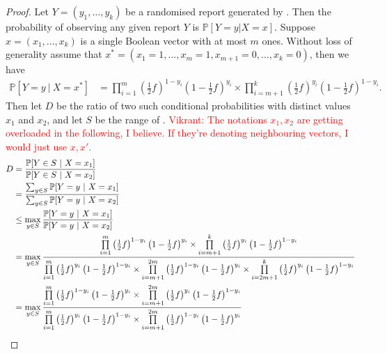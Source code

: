 \documentclass{article}
\begin{document}
\begin{proof}
	Let $Y=(y_1,\ldots,y_k)$ be a randomised report generated by . Then the probability of observing any given report $Y$ is $\mathbb{P}[Y=y | X=x]$. Suppose $x=(x_1,\ldots,x_k)$ is a single Boolean vector with at most $m$ ones. 
	Without loss of generality assume that $x^*=(x_1=1,\ldots,x_m=1,x_{m+1}=0,\ldots,x_k=0)$, then we have
	\begin{align*}
		\mathbb{P}[Y=y~|~X=x^*] &=%
			\prod\limits_{i=1}^m \left(\frac{1}{2}f\right)^{1-y_i}\left(1-\frac{1}{2}f\right)^{y_i}%
			\times \prod\limits_{i=m+1}^k\left(\frac{1}{2}f\right)^{y_i} \left(1-\frac{1}{2}f\right)^{1-y_i}.
	\end{align*}
	Then let $D$ be the ratio of two such conditional probabilities with distinct values $x_1$ and $x_2$, and let $S$ be the range of . \textcolor{red}{Vikrant: The notations $x_1,x_2$ are getting overloaded in the following, I believe. If they're denoting neighbouring vectors, I would just use $x,x'$.}
	\begin{align}
		D &= \frac{\mathbb{P}[Y\in S~|~X=x_1]}{\mathbb{P}[Y\in S~|~X=x_2]}\\
			&= \frac{\sum_{y\in S}\mathbb{P}[Y=y~|~X=x_1]}{\sum_{y\in S}\mathbb{P}[Y=y~|~X=x_2]}\nonumber\\
			&\leq \max_{y\in S}\frac{\mathbb{P}[Y=y~|~X=x_1]}{\mathbb{P}[Y=y~|~X=x_2]}\nonumber\\
			&=\max_{y\in S}\frac{%
				\prod\limits_{i=1}^m \left(\frac{1}{2}f\right)^{1-y_i}\left(1-\frac{1}{2}f\right)^{y_i}%
				\times \prod\limits_{i=m+1}^k\left(\frac{1}{2}f\right)^{y_i} \left(1-\frac{1}{2}f\right)^{1-y_i}
			}{%
				\prod\limits_{i=1}^m \left(\frac{1}{2}f\right)^{y_i}\left(1-\frac{1}{2}f\right)^{1-y_i}%
				\times \prod\limits_{i=m+1}^{2m}\left(\frac{1}{2}f\right)^{1-y_i} \left(1-\frac{1}{2}f\right)^{y_i}\times%
				\prod\limits_{i=2m+1}^{k}\left(\frac{1}{2}f\right)^{y_i}\left(1-\frac{1}{2}f\right)^{1-y_i}
			}\nonumber\\
			&=\max_{y\in S}\frac{%
				\prod\limits_{i=1}^m \left(\frac{1}{2}f\right)^{1-y_i}\left(1-\frac{1}{2}f\right)^{y_i}%
				\times \prod\limits_{i=m+1}^{2m}\left(\frac{1}{2}f\right)^{y_i} \left(1-\frac{1}{2}f\right)^{1-y_i}%
			}{%
				\prod\limits_{i=1}^m \left(\frac{1}{2}f\right)^{y_i}\left(1-\frac{1}{2}f\right)^{1-y_i}%
				\times \prod\limits_{i=m+1}^{2m}\left(\frac{1}{2}f\right)^{1-y_i} \left(1-\frac{1}{2}f\right)^{y_i}%
			}\label{eq:privacy:cancel-k}\\

\end{align}
\end{proof}
\end{document}
